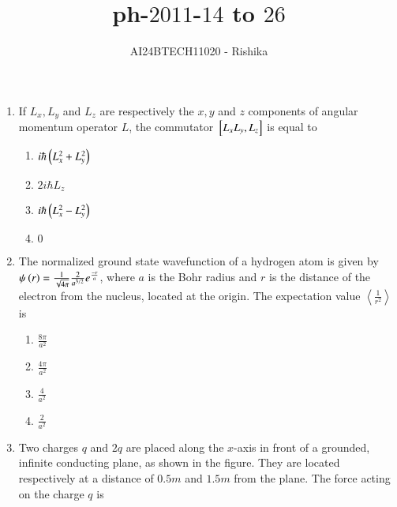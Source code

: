 \documentclass[journal,12pt,onecolumn]{IEEEtran}
\theoremstyle{remark}
\begin{document}

\vspace{3cm}

\title{ph-$2011$-$14$ to $26$}
\author{AI24BTECH11020 - Rishika}
\maketitle
\bigskip
\renewcommand{\thefigure}{\theenumi}
\renewcommand{\thetable}{\theenumi}
\begin{enumerate}[start=14]
\item If $L_x,L_y$ and $L_z$ are respectively the $x,y$ and $z$ components of angular momentum operator $L$, the commutator ${}\left[L_xL_y,L_z\right]$ is equal to
		\begin{enumerate}
        \item $i\hbar\left(L_x^2+L_y^2\right)$
	\item $2i\hbar L_z$
	\item $i\hbar\left(L_x^2-L_y^2\right)$
	\item $0$
		\end{enumerate}
\item The normalized ground state wavefunction of a hydrogen atom is given by $\psi\left(r\right)=\frac{1}{\sqrt{4\pi}}\frac{2}{a^{3/2}}e^{\frac{-r}{a}}$, where $a$ is the Bohr radius and $r$ is the distance of the electron from the nucleus, located at the origin. The expectation value $\left\langle \frac{1}{r^2} \right\rangle$ is 
		\begin{enumerate}
			\item $\frac{8\pi}{a^2}$
			\item $\frac{4\pi}{a^2}$
			\item $\frac{4}{a^2}$
			\item $\frac{2}{a^2}$
		\end{enumerate}
\item Two charges $q$ and $2q$ are placed along the $x$-axis in front of a grounded, infinite conducting plane, as shown in the figure. They are located respectively at a distance of $0.5 m$ and $1.5 m$ from the plane. The force acting on the charge $q$ is\\
	\begin{center}
\end{center}
\end{enumerate}
\end{document}
